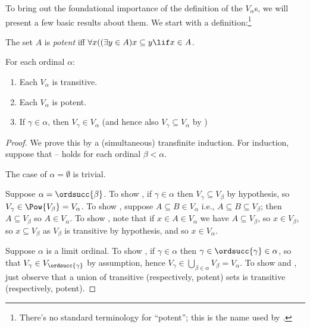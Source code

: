 \documentclass[../../../include/open-logic-section]{subfiles}
\begin{document}

To bring out the foundational importance of the definition of the
$V_\alpha$s, we will present a few basic results about them. We start with a definition:\footnote{There's no standard terminology for ``potent''; this is the name used by \citet{ButtonLT1}.}
\begin{defn}
	The set $A$ is \emph{potent} iff $\forall x((\exists y \in A)x \subseteq y \lif x \in A$. 
\end{defn}
\begin{lem}
For each ordinal $\alpha$:
\begin{enumerate}
	\item{} Each $V_\alpha$ is transitive.
	\item{} Each $V_\alpha$ is potent.
	\item{} If $\gamma \in \alpha$, then $V_\gamma
	\in V_\alpha$ (and hence also $V_\gamma \subseteq V_\alpha$ by
	)
\end{enumerate}
\end{lem}

\begin{proof}
We prove this by a (simultaneous) transfinite induction.  For
induction, suppose that -- holds
for each ordinal $\beta < \alpha$. 

The case of $\alpha = \emptyset$ is trivial. 

Suppose $\alpha = \ordsucc{\beta}$. To show , if
$\gamma \in \alpha$ then $V_\gamma \subseteq V_\beta$ by hypothesis,
so $V_\gamma \in \Pow{V_\beta} = V_\alpha$. To show
, suppose $A \subseteq B \in V_\alpha$ i.e., $A
\subseteq B \subseteq V_\beta$; then $A \subseteq V_\beta$ so $A \in
V_\alpha$. To show , note that if $x \in A \in
V_\alpha$ we have $A \subseteq V_\beta$, so $x \in V_\beta$, so $x
\subseteq V_\beta$ as $V_\beta$ is transitive by hypothesis, and so $x
\in V_\alpha$. 

Suppose $\alpha$ is  a limit ordinal. To show , if
$\gamma \in \alpha$ then $\gamma \in \ordsucc{\gamma} \in \alpha$, so
that $V_\gamma \in V_{\ordsucc{\gamma}}$ by assumption, hence
$V_\gamma \in \bigcup_{\beta \in \alpha} V_\beta = V_\alpha$. To show
 and , just observe that a
union of transitive (respectively, potent) sets is transitive
(respectively, potent). 
\end{proof}
\end{document}
